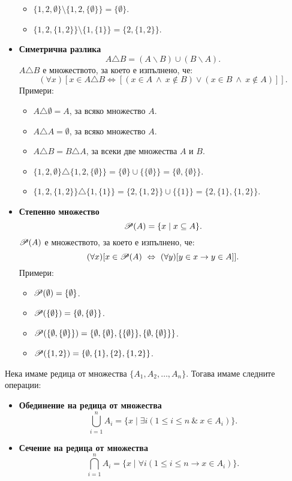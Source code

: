 \begin{itemize}
\begin{itemize}
  \item
    $\{1,2,\emptyset\} \setminus \{1,2,\{\emptyset\}\} = \{\emptyset\}$.
  \item
    $\{1,2,\{1,2\}\} \setminus \{1,\{1\}\} = \{2,\{1,2\}\}$.
  \end{itemize}
\item
  {\bf Симетрична разлика}
  \[A\triangle B = (A\backslash B)\cup (B\backslash A).\]
  $A\triangle B$ е множеството, за което е изпълнено, че:
  \[(\forall x)[x \in A\triangle B \iff [(x\in A\ \land\ x \not\in B) \vee (x \in B\ \land\ x\not\in A)]].\]
  Примери:
  \begin{itemize}
  \item 
    $A \triangle \emptyset = A$, за всяко множество $A$.
  \item
    $A \triangle A = \emptyset$, за всяко множество $A$.
  \item
    $A\triangle B = B \triangle A$, за всеки две множества $A$ и $B$.
  \item
    $\{1,2,\emptyset\} \triangle \{1,2,\{\emptyset\}\} = \{\emptyset\} \cup \{\{\emptyset\}\} = \{\emptyset,\{\emptyset\}\}$.
  \item
    $\{1,2,\{1,2\}\} \triangle \{1,\{1\}\} = \{2,\{1,2\}\} \cup \{\{1\}\} = \{2,\{1\},\{1,2\}\}$.
  \end{itemize}
\item
  {\bf Степенно множество}
  \[\mathscr{P}(A) = \{x\mid x\subseteq A\}.\]
  $\mathscr{P}(A)$ е множеството, за което е изпълнено, че:
  \[(\forall x)[x \in \mathscr{P}(A) \ \Leftrightarrow\  (\forall y)[y\in x\rightarrow y \in A]].\]
  Примери:
  \begin{itemize}
  \item 
    $\mathscr{P}(\emptyset) = \{\emptyset\}$.
  \item
    $\mathscr{P}(\{\emptyset\}) = \{\emptyset,\{\emptyset\}\}$.
  \item
    $\mathscr{P}(\{\emptyset,\{\emptyset\}\}) = \{\emptyset,\{\emptyset\},\{\{\emptyset\}\},\{\emptyset,\{\emptyset\}\}\}$.
  \item
    $\mathscr{P}(\{1,2\}) = \{\emptyset,\{1\},\{2\},\{1,2\}\}$.
  \end{itemize}
\end{itemize}
Нека имаме редица от множества $\{A_1,A_2,\dots,A_n\}$.
Тогава имаме следните операции:
\begin{itemize}
\item
  {\bf Обединение на редица от множества}
  \[\bigcup^{n}_{i=1} A_i = \{x \mid \exists i (1\leq i\leq n\ \&\ x\in A_i)\}.\]
\item
  {\bf Сечение на редица от множества}
  \[\bigcap^{n}_{i=1} A_i = \{x \mid \forall i (1\leq i\leq n \rightarrow x\in A_i)\}.\]
\end{itemize}

